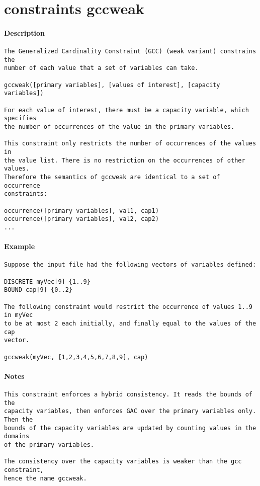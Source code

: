 \section{constraints gccweak}
\paragraph{Description}
{\footnotesize
\begin{verbatim}
The Generalized Cardinality Constraint (GCC) (weak variant) constrains the 
number of each value that a set of variables can take.

gccweak([primary variables], [values of interest], [capacity variables])

For each value of interest, there must be a capacity variable, which specifies
the number of occurrences of the value in the primary variables.

This constraint only restricts the number of occurrences of the values in
the value list. There is no restriction on the occurrences of other values.
Therefore the semantics of gccweak are identical to a set of occurrence 
constraints:

occurrence([primary variables], val1, cap1)
occurrence([primary variables], val2, cap2)
...
\end{verbatim}
}
\paragraph{Example}
{\footnotesize
\begin{verbatim}
Suppose the input file had the following vectors of variables defined:

DISCRETE myVec[9] {1..9}
BOUND cap[9] {0..2}

The following constraint would restrict the occurrence of values 1..9 in myVec
to be at most 2 each initially, and finally equal to the values of the cap
vector.

gccweak(myVec, [1,2,3,4,5,6,7,8,9], cap)
\end{verbatim}
}
\paragraph{Notes}
{\footnotesize
\begin{verbatim}
This constraint enforces a hybrid consistency. It reads the bounds of the
capacity variables, then enforces GAC over the primary variables only.  Then the
bounds of the capacity variables are updated by counting values in the domains
of the primary variables.

The consistency over the capacity variables is weaker than the gcc constraint, 
hence the name gccweak.
\end{verbatim}
}
